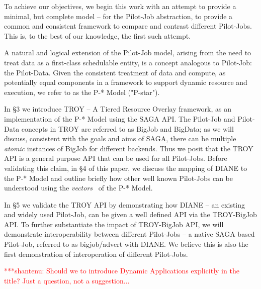 \documentclass[conference,final]{IEEEtran}
\newcommand{\jhanote}[1]{ {\textcolor{red} { ***shantenu: #1 }}}
\newcommand{\jhanote}[1]{}
\begin{document}


To achieve our objectives, we begin this work with an attempt to
provide a minimal, but complete model -- for the Pilot-Job
abstraction, to provide a common and consistent framework to compare
and contrast different Pilot-Jobs. This is, to the best of our
knowledge, the first such attempt.

A natural and logical extension of the Pilot-Job model, arising from
the need to treat data as a first-class schedulable entity, is a
concept analogous to Pilot-Job: the Pilot-Data. Given the consistent
treatment of data and compute, as potentially equal components in a
framework to support dynamic resource and execution, we refer to as
the P-* Model ("P-star").

In \S3 we introduce TROY -- A Tiered Resource Overlay framework, as an
implementation of the P-* Model using the SAGA API. The Pilot-Job and
Pilot-Data concepts in TROY are referred to as BigJob and BigData; as
we will discuss, consistent with the goals and aims of SAGA, there can
be multiple {\it atomic} instances of BigJob for different backends.
Thus we posit that the TROY API is a general purpose API that can be
used for all Pilot-Jobs. Before validating this claim, in \S4 of this
paper, we discuss the mapping of DIANE to the P-* Model and outline
briefly how other well known Pilot-Jobs can be understood using the
{\it vectors}~\cite{dpa_surveypaper} of the P-* Model.

In \S5 we validate the TROY API by demonstrating how DIANE -- an
existing and widely used Pilot-Job, can be given a well defined API
via the TROY-BigJob API. To further substantiate the impact of
TROY-BigJob API, we will demonstrate interoperability between
different Pilot-Jobs -- a native SAGA based Pilot-Job, referred to as
bigjob/advert with DIANE.  We believe this is also the first
demonstration of interoperation of different Pilot-Jobs.

\jhanote{Should we to introduce Dynamic Applications explicitly in the
  title? Just a question, not a suggestion...}



\end{document}
